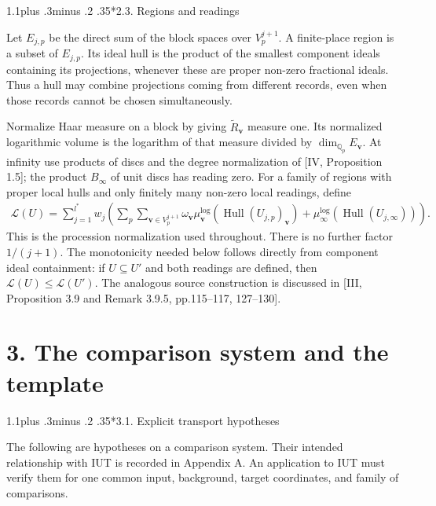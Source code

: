\documentclass[11pt,a4paper]{amsart}
\makeatletter
\renewcommand\subsection{\@startsection{subsection}{2}{\z@}
{1.1\baselineskip plus .3\baselineskip minus .2\baselineskip}
{.35\baselineskip}{\normalfont\bfseries}}
\makeatother
\begin{document}
\subsection*{2.3. Regions and readings}

Let $E_{j,p}$ be the direct sum of the block spaces over $V_p^{j+1}$. A finite-place region is a subset of $E_{j,p}$. Its ideal hull is the product of the smallest component ideals containing its projections, whenever these are proper non-zero fractional ideals. Thus a hull may combine projections coming from different records, even when those records cannot be chosen simultaneously.


Normalize Haar measure on a block by giving $\widetilde R_{\mathbf v}$ measure one. Its normalized logarithmic volume is the logarithm of that measure divided by $\dim_{\mathbb Q_p}E_{\mathbf v}$. At infinity use products of discs and the degree normalization of [IV, Proposition 1.5]; the product $B_\infty$ of unit discs has reading zero. For a family of regions with proper local hulls and only finitely many non-zero local readings, define
\begin{equation}
\begin{gathered}
\mathcal L(U)=\sum_{j=1}^{l^*}w_j\left(
\sum_p\sum_{\mathbf v\in V_p^{j+1}}\omega_{\mathbf v}
\mu_{\mathbf v}^{\log}(\operatorname{Hull}(U_{j,p})_{\mathbf v})
+\mu_\infty^{\log}(\operatorname{Hull}(U_{j,\infty}))\right).
\end{gathered}
\tag{2.9}\label{eq:2.9}
\end{equation}
This is the procession normalization used throughout. There is no further factor $1/(j+1)$. The monotonicity needed below follows directly from component ideal containment: if $U\subseteq U'$ and both readings are defined, then $\mathcal L(U)\le\mathcal L(U')$. The analogous source construction is discussed in [III, Proposition 3.9 and Remark 3.9.5, pp.115--117, 127--130].


\section*{3. The comparison system and the template}

\subsection*{3.1. Explicit transport hypotheses}

The following are hypotheses on a comparison system. Their intended relationship with IUT is recorded in Appendix A. An application to IUT must verify them for one common input, background, target coordinates, and family of comparisons.
\end{document}
